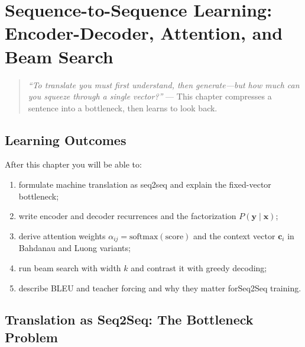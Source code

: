\chapter[Seq2Seq: Encoder-Decoder and Attention]{Sequence-to-Sequence Learning: Encoder-Decoder, Attention, and Beam Search}
\label{ch:seq2seq}

\begin{quote}
\emph{``To translate you must first understand, then generate---but how much can you squeeze through a single vector?''} --- This chapter compresses a sentence into a bottleneck, then learns to look back.
\end{quote}

\noindent{}
\vspace{0.4em}

\section*{Learning Outcomes}
After this chapter you will be able to:
\begin{enumerate}[label=(L\arabic*)]
    \item formulate machine translation as seq2seq and explain the fixed-vector bottleneck;
    \item write encoder and decoder recurrences and the factorization $P(\mathbf{y}\mid\mathbf{x})$;
    \item derive attention weights $\alpha_{ij}=\mathrm{softmax}(\mathrm{score})$ and the context vector $\mathbf{c}_i$ in Bahdanau and Luong variants;
    \item run beam search with width $k$ and contrast it with greedy decoding;
    \item describe BLEU and teacher forcing and why they matter forSeq2Seq training.
\end{enumerate}

\section{Translation as Seq2Seq: The Bottleneck Problem}
\label{sec:bottleneck}
